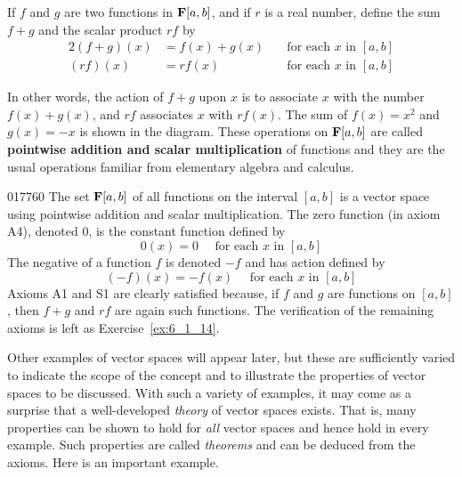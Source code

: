If $f$ and $g$ are two functions in $\textbf{F}[a, b]$, and if $r$ is a real number, define the sum $f + g$ and the scalar product $rf$ by
\begin{alignat*}{2}
(f + g)(x) 	&= f(x) + g(x) \quad &\mbox{for each }x \mbox{ in }[a, b] \\
(rf)(x) 	&= rf(x) \quad &\mbox{for each }x \mbox{ in }[a, b]
\end{alignat*}

In other words, the action of $f + g$ upon $x$ is to associate $x$
with the number $f(x) + g(x)$, and $rf$ associates $x$ with
$rf(x)$. The sum of $f(x) = x^{2}$ and $g(x) = -x$ is shown in the
diagram. These operations on $\textbf{F}[a, b]$ are called
\textbf{pointwise addition and scalar multiplication} of functions and they are the usual operations familiar from elementary algebra and calculus.

\begin{example}{}{017760}
The set $\textbf{F}[a, b]$ of all functions on the interval $[a, b]$ is a vector space using pointwise addition and scalar multiplication. The zero function (in axiom A4), denoted $0$, is the constant function defined by
\begin{equation*}
0(x) = 0 \quad \mbox{ for each }x \mbox{ in } [a, b]
\end{equation*}
The negative of a function $f$ is denoted $-f$ and has action defined by
\begin{equation*}
(-f)(x) = -f(x) \quad \mbox{ for each }x \mbox{ in } [a, b]
\end{equation*}
Axioms A1 and S1 are clearly satisfied because, if $f$ and $g$ are functions on $[a, b]$, then $f + g$ and $rf$ are again such functions. The verification of the remaining axioms is left as Exercise~\ref{ex:6_1_14}.
\end{example}

Other examples of vector spaces will appear later, but these are sufficiently varied to indicate the scope of the concept and to illustrate the properties of vector spaces to be discussed. With such a variety of examples, it may come as a surprise that a well-developed \textit{theory} of vector spaces exists. That is, many properties can be shown to hold for \textit{all} vector spaces and hence hold in every example. Such properties are called \textit{theorems} and can be deduced from the axioms. Here is an important example.

